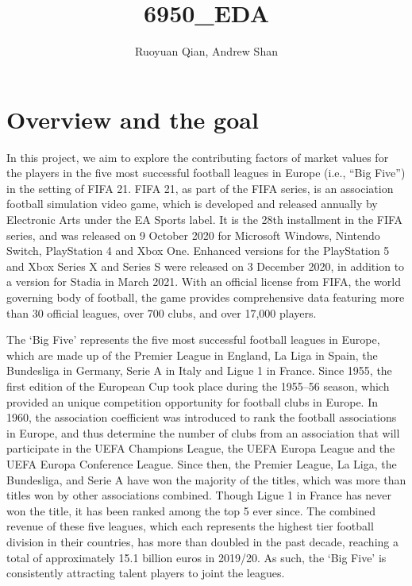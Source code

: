 \documentclass[
]{article}
\title{6950\_EDA}
\author{Ruoyuan Qian, Andrew Shan}
\date{}
\begin{document}
\maketitle

\hypertarget{overview-and-the-goal}{%
\section{Overview and the goal}\label{overview-and-the-goal}}

In this project, we aim to explore the contributing factors of market
values for the players in the five most successful football leagues in
Europe (i.e., ``Big Five'') in the setting of FIFA 21. FIFA 21, as part
of the FIFA series, is an association football simulation video game,
which is developed and released annually by Electronic Arts under the EA
Sports label. It is the 28th installment in the FIFA series, and was
released on 9 October 2020 for Microsoft Windows, Nintendo Switch,
PlayStation 4 and Xbox One. Enhanced versions for the PlayStation 5 and
Xbox Series X and Series S were released on 3 December 2020, in addition
to a version for Stadia in March 2021. With an official license from
FIFA, the world governing body of football, the game provides
comprehensive data featuring more than 30 official leagues, over 700
clubs, and over 17,000 players.

The `Big Five' represents the five most successful football leagues in
Europe, which are made up of the Premier League in England, La Liga in
Spain, the Bundesliga in Germany, Serie A in Italy and Ligue 1 in
France. Since 1955, the first edition of the European Cup took place
during the 1955--56 season, which provided an unique competition
opportunity for football clubs in Europe. In 1960, the association
coefficient was introduced to rank the football associations in Europe,
and thus determine the number of clubs from an association that will
participate in the UEFA Champions League, the UEFA Europa League and the
UEFA Europa Conference League. Since then, the Premier League, La Liga,
the Bundesliga, and Serie A have won the majority of the titles, which
was more than titles won by other associations combined. Though Ligue 1
in France has never won the title, it has been ranked among the top 5
ever since. The combined revenue of these five leagues, which each
represents the highest tier football division in their countries, has
more than doubled in the past decade, reaching a total of approximately
15.1 billion euros in 2019/20. As such, the `Big Five' is consistently
attracting talent players to joint the leagues.
\end{document}
